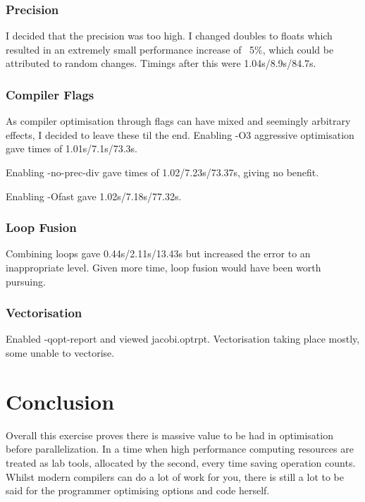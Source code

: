 \documentclass{article}
\begin{document}
\subsubsection{Precision}
I decided that the precision was too high. I changed doubles to floats which resulted in an extremely small performance increase of ~5\%, which could be attributed to random changes. Timings after this were 1.04s/8.9s/84.7s.

\subsubsection{Compiler Flags}
As compiler optimisation through flags can have mixed and seemingly arbitrary effects, I decided to leave these til the end. Enabling -O3 aggressive optimisation gave times of 1.01s/7.1s/73.3s.

Enabling -no-prec-div gave times of 1.02/7.23s/73.37s, giving no benefit.

Enabling -Ofast gave 1.02s/7.18s/77.32s.

\subsubsection{Loop Fusion}
Combining loops gave 0.44s/2.11s/13.43s but increased the error to an inappropriate level. Given more time, loop fusion would have been worth pursuing.

\subsubsection{Vectorisation}
Enabled -qopt-report and viewed jacobi.optrpt. Vectorisation taking place mostly, some unable to vectorise.

\section{Conclusion}
Overall this exercise proves there is massive value to be had in optimisation before parallelization. In a time when high performance computing resources are treated as lab tools, allocated by the second, every time saving operation counts. Whilst modern compilers can do a lot of work for you, there is still a lot to be said for the programmer optimising options and code herself.
\end{document}
